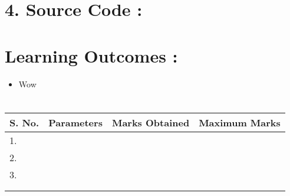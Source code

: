\documentclass[14pt]{extarticle}
\begin{document}
\newpage
\section*{\normalsize 4. Source Code :}





\section*{\normalsize Learning Outcomes :}

  \begin{itemize}
    \item Wow
  \end{itemize}

\section*{}

\begin{center}

\begin{tabular}{ |p{2.5cm}|p{4cm}|p{5cm}|p{5cm}|}
 \hline
 S. No. & Parameters & Marks Obtained & Maximum Marks \\
 \hline
 1.&&&\\
 \hline
 2.&&&\\
 \hline
 3.&&&\\
 \hline
 &&&\\
 &&&\\
 \hline
\end{tabular}
\end{center}
\end{document}

